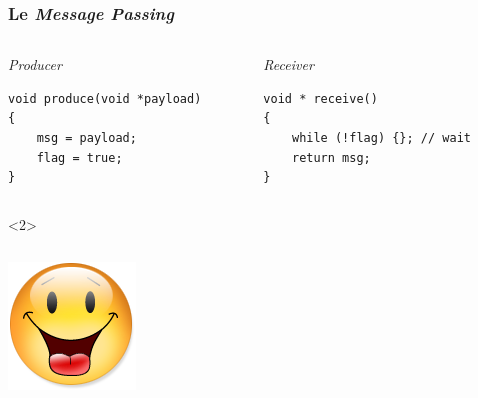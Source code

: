 \documentclass[xcolor={x11names,svgnames},x11names,svgnames]{beamer}
\begin{document}
\begin{frame}[fragile, label=tso_mp]
  \frametitle{Le \emph{Message Passing} }
  
  \begin{columns}
    \begin{column}{0.5\textwidth}
      \begin{block}{\emph{Producer}}
\begin{verbatim}
void produce(void *payload)
{          
    msg = payload;
    flag = true;
}
\end{verbatim}
      \end{block}
    \end{column}  
    \begin{column}{0.5\textwidth}
      \begin{block}{\emph{Receiver}}
\begin{verbatim}
void * receive()
{  
    while (!flag) {}; // wait
    return msg;
}
\end{verbatim}
      \end{block}
    \end{column}
  \end{columns}

  \begin{overlayarea}{\textwidth}{1cm}
    \begin{onlyenv}<2>
      \begin{columns}[c]
        \begin{column}{.1\textwidth}
          \vspace{1mm}
          \includegraphics[width=\textwidth]{Content.png}
        \end{column}


\end{columns}
\end{onlyenv}
\end{overlayarea}
\end{frame}
\end{document}
